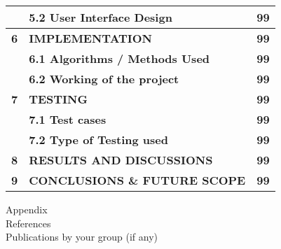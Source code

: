 {\begin{table}[H]
\begin{tabular}{| >{\bfseries}c | >{\bfseries}p{13cm} | >{\bfseries}c |}
        & 5.2 User Interface Design & 99
        \\ \hline
        6 & IMPLEMENTATION & 99
        \\ \hline
        & 6.1 Algorithms / Methods Used & 99
        \\ \hline
        & 6.2 Working of the project & 99
        \\ \hline
        7 & TESTING & 99
        \\ \hline
        & 7.1 Test cases & 99
        \\ \hline
        & 7.2 Type of Testing used & 99
        \\ \hline
        8 & RESULTS AND DISCUSSIONS & 99
        \\ \hline
        9 & CONCLUSIONS \& FUTURE SCOPE & 99
        \\ \hline

    \end{tabular}
\end{table}
}

{
\Large
Appendix \\
References \\
Publications by your group (if any) \\
}


%
\pagebreak

\endgroup
\makeatother
